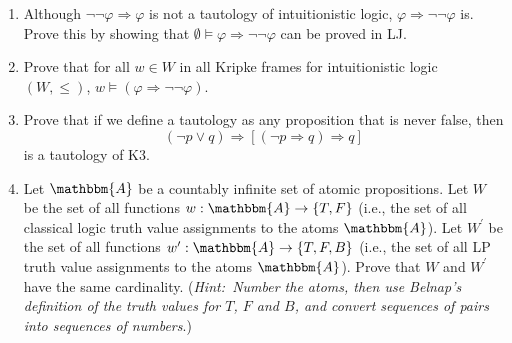 \documentclass[11pt]{article}
\theoremstyle{definition}
\theoremstyle{remark}
\begin{document}
\begin{enumerate}
    \item Although $\neg\neg\varphi\Rightarrow\varphi$ is not a tautology of intuitionistic logic, $\varphi\Rightarrow\neg\neg\varphi$ is. Prove this by showing that $\emptyset\vDash\varphi\Rightarrow\neg\neg\varphi$ can be proved in LJ.

    \item Prove that for all $w\in W$ in all Kripke frames for intuitionistic logic $(W,\leq)$, $w\vDash(\varphi\Rightarrow\neg\neg\varphi)$.

    \item Prove that if we define a tautology as any proposition that is never false, then $$(\neg p \vee q)\Rightarrow [(\neg p\Rightarrow q)\Rightarrow q]$$ is a tautology of K3. 

    \item Let $\mathbbm{A}$ be a countably infinite set of atomic propositions. Let $W$ be the set of all functions $w:\mathbbm{A}\rightarrow\{T,F\}$ (i.e., the set of all classical logic truth value assignments to the atoms $\mathbbm{A}$). Let $W^{\prime}$ be the set of all functions $w^{\prime}:\mathbbm{A}\rightarrow\{T,F,B\}$ (i.e., the set of all LP truth value assignments to the atoms $\mathbbm{A}$). Prove that $W$ and $W^{\prime}$ have the same cardinality. (\textit{Hint:\ Number the atoms, then use Belnap's definition of the truth values for $T$, $F$ and $B$, and convert sequences of pairs into sequences of numbers}.)
\end{enumerate}
\end{document}
